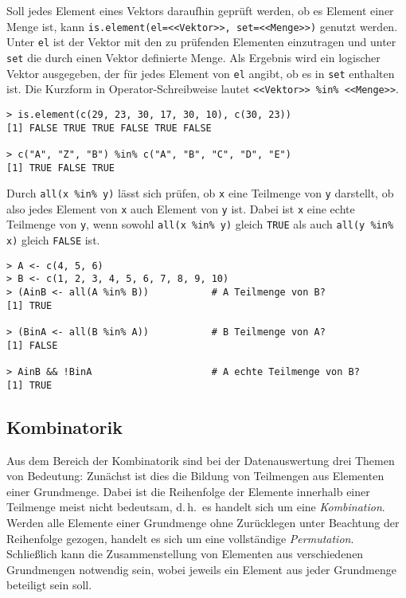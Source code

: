 Soll jedes Element eines Vektors daraufhin geprüft werden, ob es Element einer Menge ist, kann \lstinline!is.element(el=<<Vektor>>, set=<<Menge>>)! genutzt werden. Unter \lstinline!el! ist der Vektor mit den zu prüfenden Elementen einzutragen und unter \lstinline!set! die durch einen Vektor definierte Menge. Als Ergebnis wird ein logischer Vektor ausgegeben, der für jedes Element von \lstinline!el! angibt, ob es in \lstinline!set! enthalten ist. Die Kurzform in Operator-Schreibweise lautet \lstinline!<<Vektor>> %in% <<Menge>>!.
\begin{lstlisting}
> is.element(c(29, 23, 30, 17, 30, 10), c(30, 23))
[1] FALSE TRUE TRUE FALSE TRUE FALSE

> c("A", "Z", "B") %in% c("A", "B", "C", "D", "E")
[1] TRUE FALSE TRUE
\end{lstlisting}

Durch \lstinline!all(x %in% y)! lässt sich prüfen, ob \lstinline!x! eine Teilmenge von \lstinline!y! darstellt, ob also jedes Element von \lstinline!x! auch Element von \lstinline!y! ist. Dabei ist \lstinline!x! eine echte Teilmenge von \lstinline!y!, wenn sowohl \lstinline!all(x %in% y)! gleich \lstinline!TRUE! als auch \lstinline!all(y %in% x)! gleich \lstinline!FALSE! ist.
\begin{lstlisting}
> A <- c(4, 5, 6)
> B <- c(1, 2, 3, 4, 5, 6, 7, 8, 9, 10)
> (AinB <- all(A %in% B))           # A Teilmenge von B?
[1] TRUE

> (BinA <- all(B %in% A))           # B Teilmenge von A?
[1] FALSE

> AinB && !BinA                     # A echte Teilmenge von B?
[1] TRUE
\end{lstlisting}

\subsection{Kombinatorik}
\label{sec:combinatorics}

Aus dem Bereich der Kombinatorik sind bei der Datenauswertung drei Themen von Bedeutung: Zunächst ist dies die Bildung von Teilmengen aus Elementen einer Grundmenge. Dabei ist die Reihenfolge der Elemente innerhalb einer Teilmenge meist nicht bedeutsam, d.\,h.\ es handelt sich um eine \emph{Kombination}. Werden alle Elemente einer Grundmenge ohne Zurücklegen unter Beachtung der Reihenfolge gezogen, handelt es sich um eine vollständige \emph{Permutation}. Schließlich kann die Zusammenstellung von Elementen aus verschiedenen Grundmengen notwendig sein, wobei jeweils ein Element aus jeder Grundmenge beteiligt sein soll.

